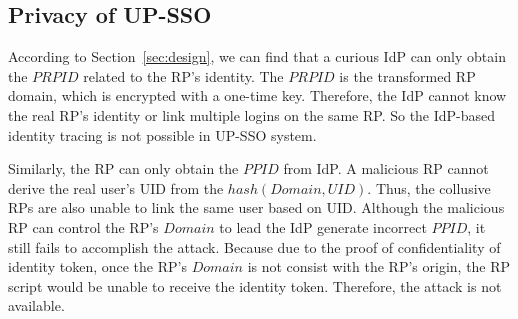 


\subsection{Privacy of UP-SSO}
According to Section~\ref{sec:design}, we can find that a curious IdP can only obtain the $PRPID$ related to the RP's identity. The $PRPID$ is the transformed RP domain, which is encrypted with a one-time key. Therefore, the IdP cannot know the real RP's identity or link multiple logins on the same RP. So the IdP-based identity tracing is not possible in UP-SSO system. 

Similarly, the RP can only obtain the $PPID$ from IdP. A malicious RP cannot derive the real user's UID from the $hash(Domain, UID)$. Thus, the collusive RPs are also unable to link the same user based on UID. Although the malicious RP can control the RP's $Domain$ to lead the IdP generate incorrect $PPID$, it still fails to accomplish the attack. Because due to the proof of confidentiality of identity token, once the RP's $Domain$ is not consist with the RP's origin, the RP script would be unable to receive the identity token. Therefore, the attack is not available. 




























